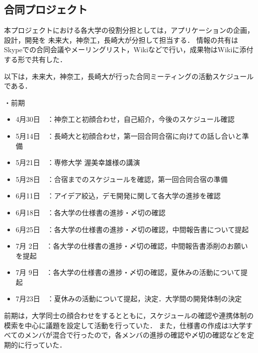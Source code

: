 \subsection{合同プロジェクト}
\par
本プロジェクトにおける各大学の役割分担としては，アプリケーションの企画，設計，開発を
未来大，神奈工，長崎大が分担して担当する．
情報の共有はSkypeでの合同会議やメーリングリスト，Wikiなどで行い，成果物はWikiに添付する形で共有した．
\par
以下は，未来大，神奈工，長崎大が行った合同ミーティングの活動スケジュールである．
\par
・前期
\begin{itemize}
\item 4月30日　：神奈工と初顔合わせ，自己紹介，今後のスケジュール確認
\item 5月14日　：長崎大と初顔合わせ，第一回合同合宿に向けての話し合いと準備
\item 5月21日　：専修大学 渥美幸雄様の講演
\item 5月28日　：合宿までのスケジュールを確認，第一回合同合宿の準備
\item 6月11日　：アイデア絞込，デモ開発に関して各大学の進捗を確認
\item 6月18日　：各大学の仕様書の進捗・〆切の確認
\item 6月25日　：各大学の仕様書の進捗・〆切の確認，中間報告書について提起
\item 7月 2日　：各大学の仕様書の進捗・〆切の確認，中間報告書添削のお願いを提起
\item 7月 9日　：各大学の仕様書の進捗・〆切の確認，夏休みの活動について提起
\item 7月23日　：夏休みの活動について提起，決定．大学間の開発体制の決定
\end{itemize}

前期は，大学同士の顔合わせをするとともに，スケジュールの確認や連携体制の模索を中心に議題を設定して活動を行っていた．
また，仕様書の作成は3大学すべてのメンバが混合で行ったので，各メンバの進捗の確認や〆切の確認などを定期的に行っていた．

